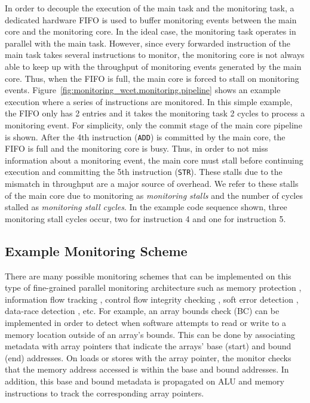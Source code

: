 In order to decouple the execution of the main task and the monitoring task, a
dedicated hardware FIFO is used to buffer monitoring events between the main
core and the monitoring core.  In the ideal case, the monitoring task operates
in parallel with the main task.  However, since 
every forwarded instruction of the main task
takes several instructions to monitor, the monitoring core is not always able to keep
up with the throughput of monitoring events generated by the main core.  Thus,
when the FIFO is full, the main core is forced to stall on monitoring events.
Figure~\ref{fig:monitoring_wcet.monitoring.pipeline} shows an example
execution where a series of instructions are monitored. In this simple example,
the FIFO only has 2 entries and it takes the monitoring task 2 cycles to
process a monitoring event. For simplicity, only the commit stage of the main
core pipeline is shown.  After the 4th instruction ({\tt ADD}) is committed by
the main core, the FIFO is full and the monitoring core is busy. Thus, in order
to not miss information about a monitoring event, the main core must stall
before continuing execution and committing the 5th instruction ({\tt STR}).
These stalls due to the mismatch in throughput are a major source of overhead.
We refer to these stalls of the main core due to monitoring as \emph{monitoring
stalls} and the number of cycles stalled as \emph{monitoring stall cycles}. In
the example code sequence shown, three monitoring stall cycles occur, two for
instruction 4 and one for instruction 5.

\subsection{Example Monitoring Scheme}
\label{sec:monitoring_wcet.monitoring.example}

There are many possible monitoring schemes that can be implemented on this type
of fine-grained parallel monitoring architecture such as memory protection
\cite{mondrian-asplos02}, information flow tracking \cite{dift-asplos04,
testudo-micro08}, control flow integrity checking \cite{hafix-dac15}, soft error
detection \cite{argus-micro07}, data-race
detection \cite{cord-hpca06, eraser-tocs97, literace-pldi09, pacer-pldi10},
etc.  For example, an array bounds check (BC) \cite{hardbound-asplos08} can be
implemented in order to detect when software attempts to read or write to a
memory location outside of an array's bounds. This can be done by associating
metadata with array pointers that indicate the arrays' base (start) and bound
(end) addresses. On loads or stores with the array pointer, the monitor checks
that the memory address accessed is within the base and bound addresses. In
addition, this base and bound metadata is propagated on ALU and memory
instructions to track the corresponding array pointers.

